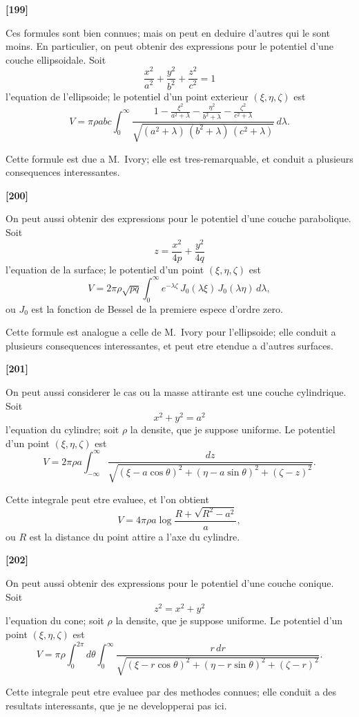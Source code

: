 \documentclass[11pt,a4paper]{book}
\begin{document}
\textbf{[199]}

Ces formules sont bien connues; mais on peut en deduire d'autres qui le sont
moins. En particulier, on peut obtenir des expressions pour le potentiel d'une couche
ellipsoidale. Soit
\[\frac{x^2}{a^2} + \frac{y^2}{b^2} + \frac{z^2}{c^2} = 1\]
l'equation de l'ellipsoide; le potentiel d'un point exterieur $(\xi, \eta, \zeta)$ est
\[V = \pi\rho a b c \int_0^{\infty} \frac{1 - \frac{\xi^2}{a^2 + \lambda} - \frac{\eta^2}{b^2 + \lambda} - \frac{\zeta^2}{c^2 + \lambda}}{\sqrt{(a^2 + \lambda)\, (b^2 + \lambda)\, (c^2 + \lambda)}}\, d\lambda.\]

Cette formule est due a M.~Ivory; elle est tres-remarquable, et conduit a plusieurs
consequences interessantes.

\textbf{[200]}

On peut aussi obtenir des expressions pour le potentiel d'une couche parabolique.
Soit
\[z = \frac{x^2}{4p} + \frac{y^2}{4q}\]
l'equation de la surface; le potentiel d'un point $(\xi, \eta, \zeta)$ est
\[V = 2\pi\rho \sqrt{pq} \int_0^{\infty} e^{-\lambda\zeta}\, J_0(\lambda\xi)\, J_0(\lambda\eta)\, d\lambda,\]
ou $J_0$ est la fonction de Bessel de la premiere espece d'ordre zero.

Cette formule est analogue a celle de M.~Ivory pour l'ellipsoide; elle conduit a
plusieurs consequences interessantes, et peut etre etendue a d'autres surfaces.

\textbf{[201]}

On peut aussi considerer le cas ou la masse attirante est une couche cylindrique.
Soit
\[x^2 + y^2 = a^2\]
l'equation du cylindre; soit $\rho$ la densite, que je suppose uniforme. Le potentiel d'un
point $(\xi, \eta, \zeta)$ est
\[V = 2\pi\rho a \int_{-\infty}^{\infty} \frac{dz}{\sqrt{(\xi - a\cos\theta)^2 + (\eta - a\sin\theta)^2 + (\zeta - z)^2}}.\]

Cette integrale peut etre evaluee, et l'on obtient
\[V = 4\pi\rho a \log \frac{R + \sqrt{R^2 - a^2}}{a},\]
ou $R$ est la distance du point attire a l'axe du cylindre.

\textbf{[202]}

On peut aussi obtenir des expressions pour le potentiel d'une couche conique.
Soit
\[z^2 = x^2 + y^2\]
l'equation du cone; soit $\rho$ la densite, que je suppose uniforme. Le potentiel d'un point
$(\xi, \eta, \zeta)$ est
\[V = \pi\rho \int_0^{2\pi} d\theta \int_0^{\infty} \frac{r\, dr}{\sqrt{(\xi - r\cos\theta)^2 + (\eta - r\sin\theta)^2 + (\zeta - r)^2}}.\]

Cette integrale peut etre evaluee par des methodes connues; elle conduit a des
resultats interessants, que je ne developperai pas ici.
\end{document}
